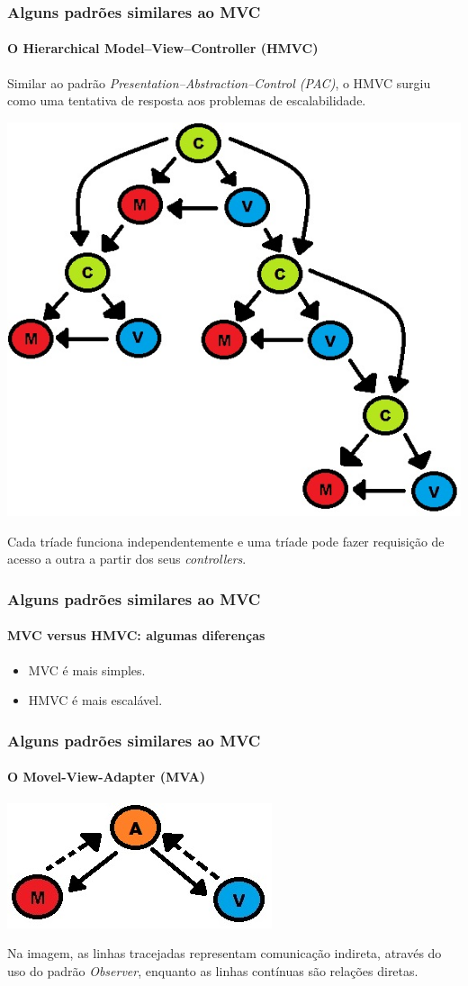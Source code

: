 \documentclass{beamer}
\begin{document}
\begin{frame}
\frametitle{Alguns padrões similares ao MVC}
\framesubtitle{O Hierarchical Model–View–Controller (HMVC)}
  Similar ao padrão \textit{Presentation–Abstraction–Control (PAC)}, o HMVC surgiu como uma tentativa de resposta aos problemas de escalabilidade.
	\begin{center}
		\includegraphics[scale=0.175]{HMVC.jpg}
	\end{center}
	Cada tríade funciona independentemente e uma tríade pode fazer requisição de acesso a outra a partir dos seus \textit{controllers}.
\end{frame}

\begin{frame}
\frametitle{Alguns padrões similares ao MVC}
\framesubtitle{MVC versus HMVC: algumas diferenças}
	\begin{itemize}
	\item MVC é mais simples.
	\item HMVC é mais escalável.
\end{itemize}
\end{frame}

\begin{frame}
\frametitle{Alguns padrões similares ao MVC}
\framesubtitle{O Movel-View-Adapter (MVA)}
	\begin{center}
		\includegraphics[scale=0.4]{MVA.jpg}
	\end{center}
	Na imagem, as linhas tracejadas representam comunicação indireta, através do uso do padrão \textit{Observer}, enquanto as linhas contínuas são relações diretas.
\end{frame}
\end{document}
